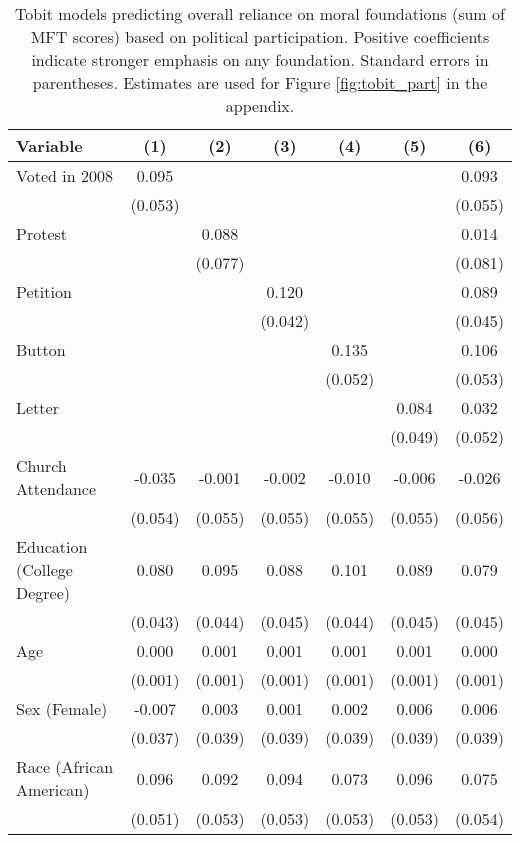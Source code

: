 \begin{table}[ht]
\centering
\caption{Tobit models predicting overall reliance on moral foundations
           (sum of MFT scores) based on political participation. Positive coefficients indicate 
           stronger emphasis on any foundation. Standard errors in parentheses. Estimates are 
           used for Figure \ref{fig:tobit_part} in the appendix.} 
\label{tab:tobit_part}
\begingroup\footnotesize
\begin{tabular}{lcccccc}
  \hline
Variable & (1) & (2) & (3) & (4) & (5) & (6) \\ 
  \hline
Voted in 2008 &  0.095 &  &  &  &  &  0.093 \\ 
   & (0.053) &  &  &  &  & (0.055) \\ 
  Protest &  &  0.088 &  &  &  &  0.014 \\ 
   &  & (0.077) &  &  &  & (0.081) \\ 
  Petition &  &  &  0.120 &  &  &  0.089 \\ 
   &  &  & (0.042) &  &  & (0.045) \\ 
  Button &  &  &  &  0.135 &  &  0.106 \\ 
   &  &  &  & (0.052) &  & (0.053) \\ 
  Letter &  &  &  &  &  0.084 &  0.032 \\ 
   &  &  &  &  & (0.049) & (0.052) \\ 
  Church Attendance & -0.035 & -0.001 & -0.002 & -0.010 & -0.006 & -0.026 \\ 
   & (0.054) & (0.055) & (0.055) & (0.055) & (0.055) & (0.056) \\ 
  Education (College Degree) &  0.080 &  0.095 &  0.088 &  0.101 &  0.089 &  0.079 \\ 
   & (0.043) & (0.044) & (0.045) & (0.044) & (0.045) & (0.045) \\ 
  Age &  0.000 &  0.001 &  0.001 &  0.001 &  0.001 &  0.000 \\ 
   & (0.001) & (0.001) & (0.001) & (0.001) & (0.001) & (0.001) \\ 
  Sex (Female) & -0.007 &  0.003 &  0.001 &  0.002 &  0.006 &  0.006 \\ 
   & (0.037) & (0.039) & (0.039) & (0.039) & (0.039) & (0.039) \\ 
  Race (African American) &  0.096 &  0.092 &  0.094 &  0.073 &  0.096 &  0.075 \\ 
   & (0.051) & (0.053) & (0.053) & (0.053) & (0.053) & (0.054) \\ 

\end{tabular}
\end{table}
